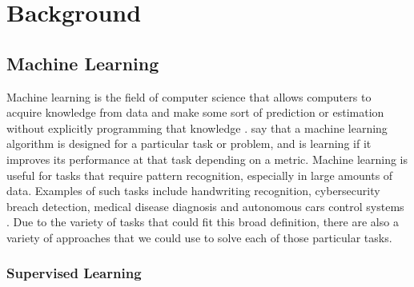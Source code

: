 \chapter{Background}
\label{bckgnd}

\section{ Machine Learning}
Machine learning is the field of computer science that allows computers to acquire knowledge from data and make some sort of prediction or estimation without explicitly programming that knowledge \cite{bishop_2013}. \citet{ai_text_book} say that a machine learning algorithm is designed for a particular task or problem, and is learning if it improves its performance at that task depending on a metric. Machine learning is useful for tasks that require pattern recognition, especially in large amounts of data.  Examples of such tasks include handwriting recognition, cybersecurity breach detection, medical disease diagnosis and autonomous cars control systems \cite{lecun1998mnist,cybersecurity,3d_conf_for_alzheimers,driverless_cars}. Due to the variety of tasks that could fit this broad definition, there are also a variety of approaches that we could use to solve each of those particular tasks.


\subsection{Supervised Learning}
\label{supervised}

